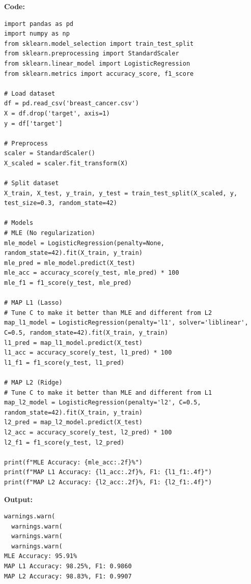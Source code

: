 \documentclass[12pt, a4paper]{article}
\begin{document}
\vspace{\baselineskip}
\noindent \textbf{Code:}\\
\begin{lstlisting}
import pandas as pd
import numpy as np
from sklearn.model_selection import train_test_split
from sklearn.preprocessing import StandardScaler
from sklearn.linear_model import LogisticRegression
from sklearn.metrics import accuracy_score, f1_score

# Load dataset
df = pd.read_csv('breast_cancer.csv')
X = df.drop('target', axis=1)
y = df['target']

# Preprocess
scaler = StandardScaler()
X_scaled = scaler.fit_transform(X)

# Split dataset
X_train, X_test, y_train, y_test = train_test_split(X_scaled, y, test_size=0.3, random_state=42)

# Models
# MLE (No regularization)
mle_model = LogisticRegression(penalty=None, random_state=42).fit(X_train, y_train)
mle_pred = mle_model.predict(X_test)
mle_acc = accuracy_score(y_test, mle_pred) * 100
mle_f1 = f1_score(y_test, mle_pred)

# MAP L1 (Lasso)
# Tune C to make it better than MLE and different from L2
map_l1_model = LogisticRegression(penalty='l1', solver='liblinear', C=0.5, random_state=42).fit(X_train, y_train)
l1_pred = map_l1_model.predict(X_test)
l1_acc = accuracy_score(y_test, l1_pred) * 100
l1_f1 = f1_score(y_test, l1_pred)

# MAP L2 (Ridge)
# Tune C to make it better than MLE and different from L1
map_l2_model = LogisticRegression(penalty='l2', C=0.5, random_state=42).fit(X_train, y_train)
l2_pred = map_l2_model.predict(X_test)
l2_acc = accuracy_score(y_test, l2_pred) * 100
l2_f1 = f1_score(y_test, l2_pred)

print(f"MLE Accuracy: {mle_acc:.2f}%")
print(f"MAP L1 Accuracy: {l1_acc:.2f}%, F1: {l1_f1:.4f}")
print(f"MAP L2 Accuracy: {l2_acc:.2f}%, F1: {l2_f1:.4f}")

\end{lstlisting}

\vspace{\baselineskip}

\noindent \textbf{Output:}\\
\begin{lstlisting}[style=terminal]
  warnings.warn(
  warnings.warn(
  warnings.warn(
  warnings.warn(
MLE Accuracy: 95.91%
MAP L1 Accuracy: 98.25%, F1: 0.9860
MAP L2 Accuracy: 98.83%, F1: 0.9907
\end{lstlisting}
\end{document}
